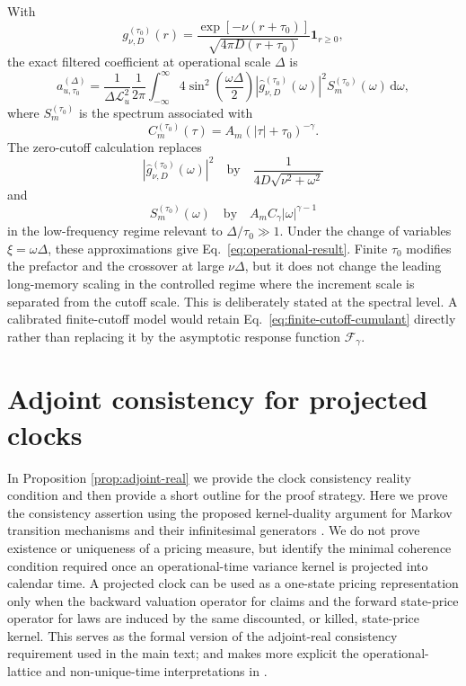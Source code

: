 \documentclass[11pt]{amsart}
\newcommand{\dd}{\,\mathrm{d}}
\newcommand{\wh}[1]{\widehat{#1}}
\newcommand{\cL}{\mathcal{L}}
\newcommand{\Fcal}{\mathcal{F}}
\theoremstyle{definition}
\theoremstyle{plain}
\theoremstyle{remark}
\begin{document}
With
\begin{equation}
 g_{\nu,D}^{(\tau_0)}(r)=\frac{\exp[-\nu(r+\tau_0)]}{\sqrt{4\pi D(r+\tau_0)}}\mathbf 1_{r\ge0},
\end{equation}
the exact filtered coefficient at operational scale $\Delta$ is
\begin{equation}
 a_{u,\tau_0}^{(\Delta)}=
 \frac{1}{\Delta\cL_u^2}\frac{1}{2\pi}
 \int_{-\infty}^{\infty}4\sin^2\left(\frac{\omega\Delta}{2}\right)
 \left|\wh g_{\nu,D}^{(\tau_0)}(\omega)\right|^2
 S_m^{(\tau_0)}(\omega)\dd\omega,
 \label{eq:finite-cutoff-cumulant}
\end{equation}
where $S_m^{(\tau_0)}$ is the spectrum associated with
\begin{equation}
 C_m^{(\tau_0)}(\tau)=A_m(|\tau|+\tau_0)^{-\gamma}.
\end{equation}
The zero-cutoff calculation replaces
\begin{equation}
 \left|\wh g_{\nu,D}^{(\tau_0)}(\omega)\right|^2
 \quad\text{by}\quad
 \frac{1}{4D\sqrt{\nu^2+\omega^2}}
\end{equation}
and
\begin{equation}
 S_m^{(\tau_0)}(\omega)
 \quad\text{by}\quad
 A_m C_\gamma |\omega|^{\gamma-1}
\end{equation}
in the low-frequency regime relevant to $\Delta/\tau_0\gg1$. Under the change of variables $\xi=\omega\Delta$, these approximations give Eq.~\eqref{eq:operational-result}. Finite $\tau_0$ modifies the prefactor and the crossover at large $\nu\Delta$, but it does not change the leading long-memory scaling in the controlled regime where the increment scale is separated from the cutoff scale. This is deliberately stated at the spectral level. A calibrated finite-cutoff model would retain Eq.~\eqref{eq:finite-cutoff-cumulant} directly rather than replacing it by the asymptotic response function $\Fcal_\gamma$.

\section{Adjoint consistency for projected clocks}
\label{app:adjoint-consistency}

In Proposition \ref{prop:adjoint-real} we provide the clock consistency reality condition and then provide a short outline for the proof strategy. Here we prove the consistency assertion using the proposed kernel-duality argument for Markov transition mechanisms and their infinitesimal generators \cite{EthierKurtz1986,Dynkin1965MarkovProcessesI,Feller1971Volume2}. We do not prove existence or uniqueness of a pricing measure, but identify the minimal coherence condition required once an operational-time variance kernel is projected into calendar time.  A projected clock can be used as a one-state pricing representation only when the backward valuation operator for claims and the forward state-price operator for laws are induced by the same discounted, or killed, state-price kernel. This serves as the formal version of the adjoint-real consistency requirement used in the main text; and makes more explicit the operational-lattice and non-unique-time interpretations in \cite{AngstmannGebbieBSMFromLattice2026,AngstmannGebbie2026NonUniqueTime}.
\end{document}
